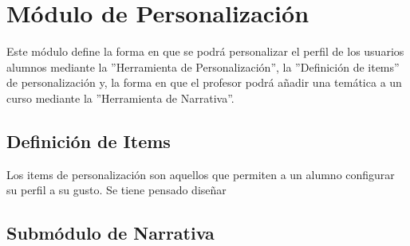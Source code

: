 \chapter{Módulo de Personalización}
\label{mod:personalizacion}

    Este módulo define la forma en que se podrá personalizar el perfil de los usuarios alumnos mediante la ''Herramienta de Personalización'', la ''Definición de items'' de personalización y, la forma en que el profesor podrá añadir una temática a un curso mediante la ''Herramienta de Narrativa''.

\section{Definición de Items}

    Los items de personalización son aquellos que permiten a un alumno configurar su perfil a su gusto. Se tiene pensado diseñar
    
    
    
    
    
    
    
\section{Submódulo de Narrativa}

    

